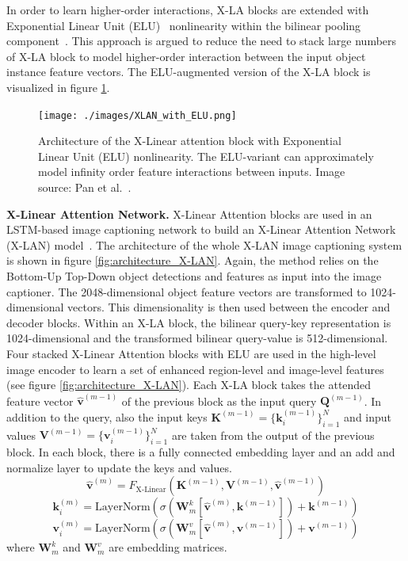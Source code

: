 \documentclass[english,twoside,openright]{HYgraduMLDS}
\newcommand{\matr}[1]{\bm{#1}}
\newcommand{\vect}[1]{\bm{#1}}
\begin{document}
In order to learn higher-order interactions, X-LA blocks are extended with Exponential Linear Unit (ELU)~\cite{ELU} nonlinearity within the bilinear pooling component~\cite{XLinearAN}. This approach is argued to reduce the need to stack large numbers of X-LA block to model higher-order interaction between the input object instance feature vectors. The ELU-augmented version of the X-LA block is visualized in figure \ref{fig:XLAN_with_ELU}.

\begin{figure}[h] 
\centering
\texttt{[image: ./images/XLAN\_with\_ELU.png]}
\caption{Architecture of the X-Linear attention block with Exponential Linear Unit (ELU) nonlinearity. The ELU-variant can approximately model infinity order feature interactions between inputs. Image source: Pan et al.~\cite{XLinearAN}.}
\label{fig:XLAN_with_ELU} 
\end{figure}

\textbf{X-Linear Attention Network.} X-Linear Attention blocks are used in an LSTM-based image captioning network to build an X-Linear Attention Network (X-LAN) model~\cite{XLinearAN}. The architecture of the whole X-LAN image captioning system is shown in figure \ref{fig:architecture_X-LAN}. Again, the method relies on the Bottom-Up Top-Down object detections and features as input into the image captioner. The 2048-dimensional object feature vectors are transformed to 1024-dimensional vectors. This dimensionality is then used between the encoder and decoder blocks. Within an X-LA block, the bilinear query-key representation is 1024-dimensional and the transformed bilinear query-value is 512-dimensional. Four stacked X-Linear Attention blocks with ELU are used in the high-level image encoder to learn a set of enhanced region-level and image-level features (see figure \ref{fig:architecture_X-LAN}). Each X-LA block takes the attended feature vector $\hat{\vect{v}}^{(m-1)}$ of the previous block as the input query $\matr{Q}^{(m-1)}$. In addition to the query, also the input keys $\matr{K}^{(m-1)} = \{\vect{k}_i^{(m-1)}\}_{i=1}^N$ and input values $\matr{V}^{(m-1)} = \{\vect{v}_i^{(m-1)}\}_{i=1}^N$ are taken from the output of the previous block. In each block, there is a fully connected embedding layer and an add and normalize layer to update the keys and values.
\begin{equation}
\hat{\vect{v}}^{(m)} = F_\text{X-Linear}(\matr{K}^{(m-1)}, \matr{V}^{(m-1)}, \hat{\vect{v}}^{(m-1)})
\end{equation}
%
\begin{equation}
\vect{k}_i^{(m)}= \text{LayerNorm}(\sigma(\matr{W}^k_m[\hat{\vect{v}}^{(m)}, \vect{k}^{(m-1)}]) + \vect{k}^{(m-1)})
\end{equation}
%
\begin{equation}
\vect{v}_i^{(m)}= \text{LayerNorm}(\sigma(\matr{W}^v_m[\hat{\vect{v}}^{(m)}, \vect{v}^{(m-1)}]) + \vect{v}^{(m-1)})
\end{equation}
%
where $\matr{W}^k_m$ and $\matr{W}^v_m$ are embedding matrices.
\end{document}
